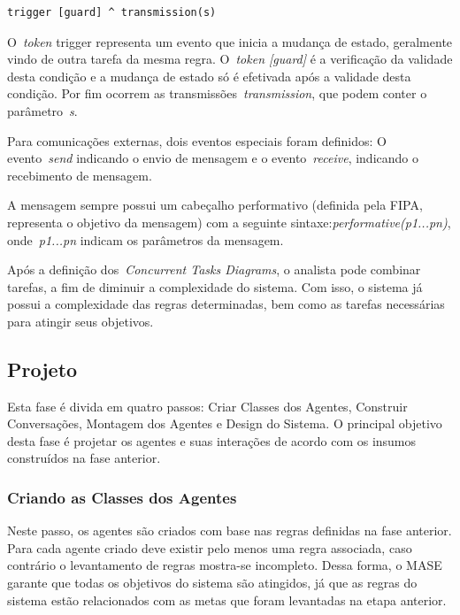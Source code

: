 \begin{lstlisting}[label=code:sintaxe-concurrent-task,caption=Sintaxe da mudança de estado.]
	trigger [guard] ^ transmission(s)
\end{lstlisting}

O~\emph{token} trigger representa um evento que inicia a mudança de estado, geralmente vindo de outra tarefa da mesma regra. O~\emph{token [guard]} é a verificação da validade desta condição e a mudança de estado só é efetivada após a validade desta condição. Por fim ocorrem as transmissões~\emph{transmission}, que podem conter o parâmetro~\emph{s}.

Para comunicações externas, dois eventos especiais foram definidos: O evento~\emph{send} indicando o envio de mensagem e o evento~\emph{receive}, indicando o recebimento de mensagem.

A mensagem sempre possui um cabeçalho performativo (definida pela FIPA, representa o objetivo da mensagem) com a seguinte sintaxe:\emph{performative(p1...pn)}, onde~\emph{p1...pn} indicam os parâmetros da mensagem.

Após a definição dos~\emph{Concurrent Tasks Diagrams}, o analista pode combinar tarefas, a fim de diminuir a complexidade do sistema. Com isso, o sistema já possui a complexidade das regras determinadas, bem como as tarefas necessárias para atingir seus objetivos.

\subsection{Projeto}

Esta fase é divida em quatro passos: Criar Classes dos Agentes, Construir Conversações, Montagem dos Agentes e Design do Sistema. O principal objetivo desta fase é projetar os agentes e suas interações de acordo com os insumos construídos na fase anterior.

\subsubsection{Criando as Classes dos Agentes}

Neste passo, os agentes são criados com base nas regras definidas na fase anterior. Para cada agente criado deve existir pelo menos uma regra associada, caso contrário o levantamento de regras mostra-se incompleto. Dessa forma, o MASE garante que todas os objetivos  do sistema são atingidos, já que as regras do sistema estão relacionados com as metas que foram levantadas na etapa anterior.

